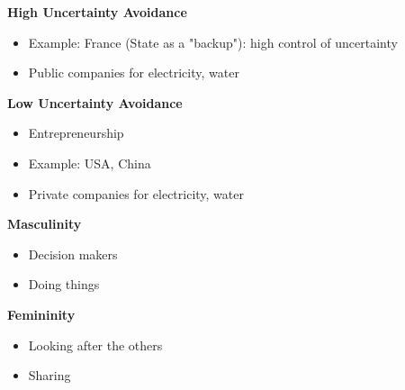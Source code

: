 \documentclass[11pt,a4paper,oneside,french,svgnames]{report}
\begin{document}
\begin{center}
\begin{minipage}[t]{.45\textwidth}
\centering\textbf{High Uncertainty Avoidance}\\
  \begin{itemize}
    \item Example: France (State as a "backup"): high control of uncertainty
    \item Public companies for electricity, water
  \end{itemize}
\end{minipage}
\begin{minipage}[t]{.45\textwidth}
\centering\textbf{Low Uncertainty Avoidance}\\
  \begin{itemize}
    \item Entrepreneurship
    \item Example: USA, China
    \item Private companies for electricity, water
  \end{itemize}
\end{minipage}

\begin{minipage}[t]{.45\textwidth}
\centering\textbf{Masculinity}\\
  \begin{itemize}
    \item Decision makers
    \item Doing things
  \end{itemize}
\end{minipage}
\begin{minipage}[t]{.45\textwidth}
\centering\textbf{Femininity}\\
  \begin{itemize}
    \item Looking after the others
    \item Sharing
  \end{itemize}
\end{minipage}

\end{center}
\end{document}

